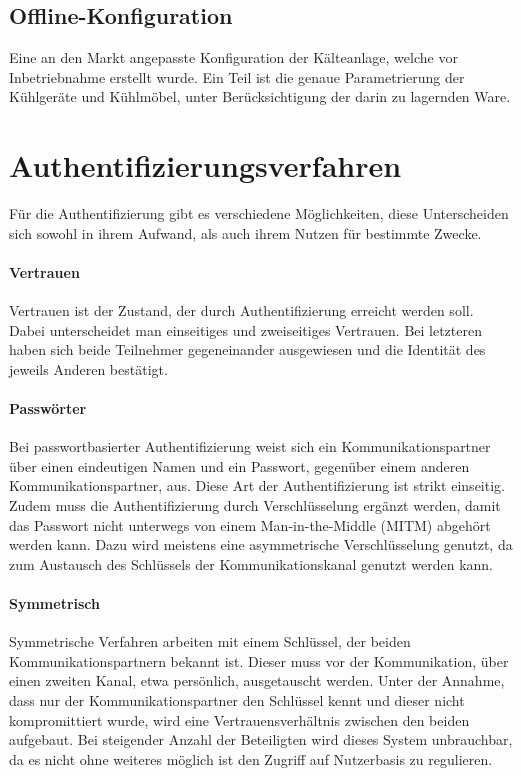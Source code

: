 \documentclass[11pt,a4paper]{report}
\begin{document}
\subsection{Offline-Konfiguration} Eine an den Markt angepasste Konfiguration der Kälteanlage, welche vor Inbetriebnahme erstellt wurde. Ein Teil ist die genaue Parametrierung der Kühlgeräte und Kühlmöbel, unter Berücksichtigung der darin zu lagernden Ware.

\section{Authentifizierungsverfahren}

Für die Authentifizierung gibt es verschiedene Möglichkeiten, diese Unterscheiden sich sowohl in ihrem Aufwand, als auch ihrem Nutzen für bestimmte Zwecke.

\paragraph{Vertrauen}

Vertrauen ist der Zustand, der durch Authentifizierung erreicht werden soll. Dabei unterscheidet man einseitiges und zweiseitiges Vertrauen. Bei letzteren haben sich beide Teilnehmer gegeneinander ausgewiesen und die Identität des jeweils Anderen bestätigt. 

\paragraph{Passwörter}

Bei passwortbasierter Authentifizierung weist sich ein Kommunikationspartner über einen eindeutigen Namen und ein Passwort, gegenüber einem anderen Kommunikationspartner, aus. Diese Art der Authentifizierung ist strikt einseitig. Zudem muss die Authentifizierung durch Verschlüsselung ergänzt werden, damit das Passwort nicht unterwegs von einem Man-in-the-Middle (MITM) abgehört werden kann. Dazu wird meistens eine asymmetrische Verschlüsselung genutzt, da zum Austausch des Schlüssels der Kommunikationskanal genutzt werden kann.

\paragraph{Symmetrisch}

Symmetrische Verfahren arbeiten mit einem Schlüssel, der beiden Kommunikationspartnern bekannt ist. Dieser muss vor der Kommunikation, über einen zweiten Kanal, etwa persönlich, ausgetauscht werden. Unter der Annahme, dass nur der Kommunikationspartner den Schlüssel kennt und dieser nicht kompromittiert wurde, wird eine Vertrauensverhältnis zwischen den beiden aufgebaut. Bei steigender Anzahl der Beteiligten wird dieses System unbrauchbar, da es nicht ohne weiteres möglich ist den Zugriff auf Nutzerbasis zu regulieren.
\end{document}
